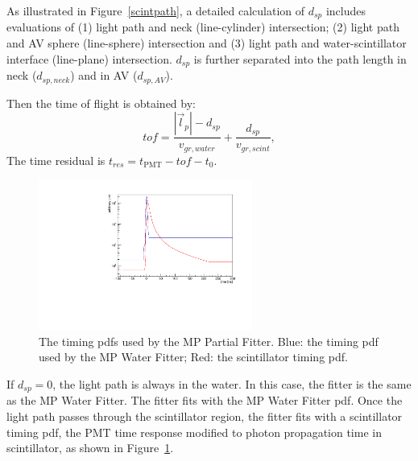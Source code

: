 \documentclass[preprint,12pt]{elsarticle}
\numberwithin{equation}{section}
\begin{document}
As illustrated in Figure~\ref{scintpath}, a detailed calculation of $d_{sp}$ includes evaluations of (1) light path and neck (line-cylinder) intersection; (2) light path and AV sphere (line-sphere) intersection and (3) light path and water-scintillator interface (line-plane) intersection. $d_{sp}$ is further separated into the path length in neck ($d_{sp,neck}$) and in AV ($d_{sp,AV}$).

Then the time of flight is obtained by:
\begin{equation}
tof = \frac{|\vec{l}_p|-d_{sp}}{v_{gr,water}} +\frac{d_{sp}}{v_{gr,scint}},
\end{equation}
The time residual is $t_{res} = t_\mathrm{PMT}-tof-t_0$.

\begin{figure}[htbp]
	\centering	
	\includegraphics[width=7cm]{scintpdf.pdf}
	\caption{The timing pdfs used by the MP Partial Fitter. Blue: the timing pdf used by the MP Water Fitter; Red: the scintillator timing pdf.}
	\label{partialpdf}
\end{figure}

If $d_{sp}=0$, the light path is always in the water. In this case, the fitter is the same as the MP Water Fitter. The fitter fits with the MP Water Fitter pdf. Once the light path passes through the scintillator region, the fitter fits with a scintillator timing pdf, the PMT time response modified to photon propagation time in scintillator, as shown in Figure~\ref{partialpdf}.
\end{document}
